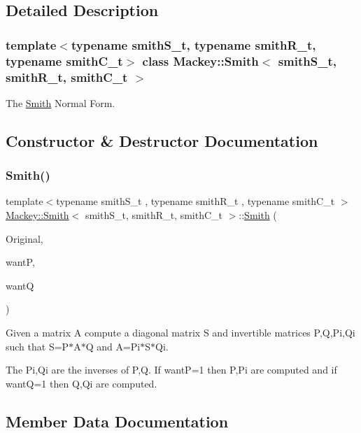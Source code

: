 \subsection{Detailed Description}
\subsubsection*{template$<$typename smith\+S\+\_\+t, typename smith\+R\+\_\+t, typename smith\+C\+\_\+t$>$\newline
class Mackey\+::\+Smith$<$ smith\+S\+\_\+t, smith\+R\+\_\+t, smith\+C\+\_\+t $>$}

The \hyperlink{classMackey_1_1Smith}{Smith} Normal Form. 

\subsection{Constructor \& Destructor Documentation}
\mbox{\label{classMackey_1_1Smith_a43f657bfa335acf5fe10dd864326c0aa}} 
\subsubsection{\texorpdfstring{Smith()}{Smith()}}
{\footnotesize\ttfamily template$<$typename smith\+S\+\_\+t , typename smith\+R\+\_\+t , typename smith\+C\+\_\+t $>$ \\
\hyperlink{classMackey_1_1Smith}{Mackey\+::\+Smith}$<$ smith\+S\+\_\+t, smith\+R\+\_\+t, smith\+C\+\_\+t $>$\+::\hyperlink{classMackey_1_1Smith}{Smith} (\begin{DoxyParamCaption}\item[{const smith\+S\+\_\+t \&}]{Original,  }\item[{const bool \&}]{wantP,  }\item[{const bool \&}]{wantQ }\end{DoxyParamCaption})}



Given a matrix A compute a diagonal matrix S and invertible matrices P,Q,Pi,Qi such that S=P$\ast$\+A$\ast$Q and A=Pi$\ast$\+S$\ast$\+Qi. 

The Pi,Qi are the inverses of P,Q. If wantP=1 then P,Pi are computed and if wantQ=1 then Q,Qi are computed. 

\subsection{Member Data Documentation}
\mbox{\label{classMackey_1_1Smith_af473e56486c5081b2e1f657bc8df5539}} 

